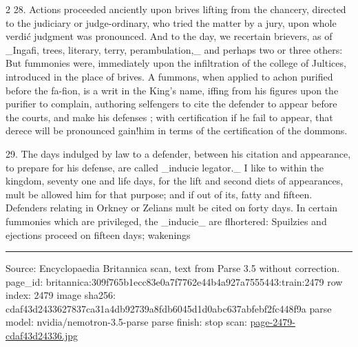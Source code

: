 \documentclass[10pt]{article}
\begin{document}
\begin{multicols}{2}
28. Actions proceeded anciently upon brives lifting from the chancery, directed to the judiciary or judge-ordinary, who tried the matter by a jury, upon whole verdić judgment was pronounced. And to the day, we recertain brievers, as of \_Ingafi, trees, literary, terry, perambulation,\_ and perhaps two or three others: But fummonies were, immediately upon the infiltration of the college of Jultices, introduced in the place of brives. A fummons, when applied to achon purified before the fa-fion, is a writ in the King's name, iffing from his figures upon the purifier to complain, authoring selfengers to cite the defender to appear before the courts, and make his defenses ; with certification if he fail to appear, that derece will be pronounced gain!him in terms of the certification of the dommons.

29. The days indulged by law to a defender, between his citation and appearance, to prepare for his defense, are called \_inducie legator.\_ I like to within the kingdom, seventy one and life days, for the lift and second diets of appearances, mult be allowed him for that purpose; and if out of its, fatty and fifteen. Defenders relating in Orkney or Zelians mult be cited on forty days. In certain fummonies which are privileged, the \_inducie\_ are flhortered: Spuilzies and ejections proceed on fifteen days; wakenings

\end{multicols}
\vfill\par\noindent\rule{\linewidth}{0.4pt}\par
{\scriptsize\color{gray}\noindent Source: Encyclopaedia Britannica scan, text from Parse 3.5 without correction. page\_id: britannica:309f765b1ecc83e0a7f7762e44b4a927a7555443:train:2479 \quad row index: 2479 \quad image sha256: cdaf43d2433627837ca31a4db92739a8fdb6045d1d0abc637abfebf2fc448f9a \quad parse model: nvidia/nemotron-3.5-parse \quad parse finish: stop \quad scan: \href{../scans/page-2479-cdaf43d24336.jpg}{page-2479-cdaf43d24336.jpg}\par}
\end{document}
